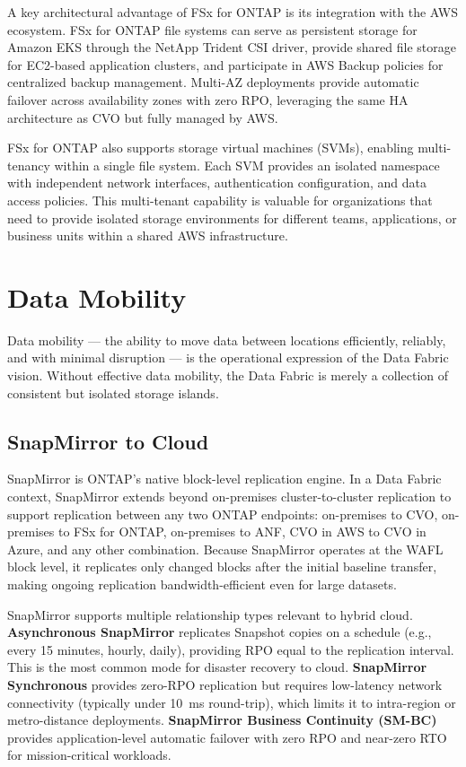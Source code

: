 A key architectural advantage of FSx for ONTAP is its integration with the AWS
ecosystem. FSx for ONTAP file systems can serve as persistent storage for
Amazon EKS through the NetApp Trident CSI driver, provide shared file storage
for EC2-based application clusters, and participate in AWS Backup policies for
centralized backup management. Multi-AZ deployments provide automatic failover
across availability zones with zero RPO, leveraging the same HA architecture
as CVO but fully managed by AWS.

FSx for ONTAP also supports storage virtual machines (SVMs), enabling
multi-tenancy within a single file system. Each SVM provides an isolated
namespace with independent network interfaces, authentication configuration,
and data access policies. This multi-tenant capability is valuable for
organizations that need to provide isolated storage environments for different
teams, applications, or business units within a shared AWS infrastructure.

\section{Data Mobility}

Data mobility --- the ability to move data between locations efficiently,
reliably, and with minimal disruption --- is the operational expression of the
Data Fabric vision. Without effective data mobility, the Data Fabric is merely
a collection of consistent but isolated storage islands.

\subsection{SnapMirror to Cloud}

SnapMirror is ONTAP's native block-level replication engine. In a Data Fabric
context, SnapMirror extends beyond on-premises cluster-to-cluster replication
to support replication between any two ONTAP endpoints: on-premises to CVO,
on-premises to FSx for ONTAP, on-premises to ANF, CVO in AWS to CVO in
Azure, and any other combination. Because SnapMirror operates at the WAFL
block level, it replicates only changed blocks after the initial baseline
transfer, making ongoing replication bandwidth-efficient even for large
datasets.

SnapMirror supports multiple relationship types relevant to hybrid cloud.
\textbf{Asynchronous SnapMirror} replicates Snapshot copies on a schedule
(e.g., every 15 minutes, hourly, daily), providing RPO equal to the
replication interval. This is the most common mode for disaster recovery to
cloud. \textbf{SnapMirror Synchronous} provides zero-RPO replication but
requires low-latency network connectivity (typically under 10~ms round-trip),
which limits it to intra-region or metro-distance deployments.
\textbf{SnapMirror Business Continuity (SM-BC)} provides application-level
automatic failover with zero RPO and near-zero RTO for mission-critical
workloads.

